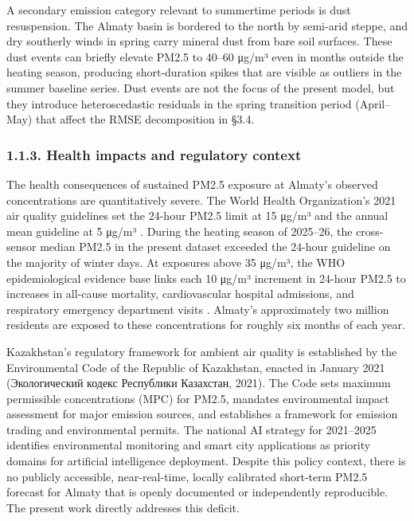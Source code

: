 A secondary emission category relevant to summertime periods is dust resuspension. The Almaty basin is bordered to the north by semi-arid steppe, and dry southerly winds in spring carry mineral dust from bare soil surfaces. These dust events can briefly elevate PM2.5 to 40--60 μg/m³ even in months outside the heating season, producing short-duration spikes that are visible as outliers in the summer baseline series. Dust events are not the focus of the present model, but they introduce heteroscedastic residuals in the spring transition period (April--May) that affect the RMSE decomposition in §3.4.

\subsubsection{1.1.3. Health impacts and regulatory context}\label{health-impacts-and-regulatory-context}

The health consequences of sustained PM2.5 exposure at Almaty's observed concentrations are quantitatively severe. The World Health Organization's 2021 air quality guidelines set the 24-hour PM2.5 limit at 15 μg/m³ and the annual mean guideline at 5 μg/m³ \cite{who_aqg_2021}. During the heating season of 2025--26, the cross-sensor median PM2.5 in the present dataset exceeded the 24-hour guideline on the majority of winter days. At exposures above 35 μg/m³, the WHO epidemiological evidence base links each 10 μg/m³ increment in 24-hour PM2.5 to increases in all-cause mortality, cardiovascular hospital admissions, and respiratory emergency department visits \cite{WHO2013revihaap}. Almaty's approximately two million residents are exposed to these concentrations for roughly six months of each year.

Kazakhstan's regulatory framework for ambient air quality is established by the Environmental Code of the Republic of Kazakhstan, enacted in January 2021 (Экологический кодекс Республики Казахстан, 2021). The Code sets maximum permissible concentrations (MPC) for PM2.5, mandates environmental impact assessment for major emission sources, and establishes a framework for emission trading and environmental permits. The national AI strategy for 2021--2025 identifies environmental monitoring and smart city applications as priority domains for artificial intelligence deployment. Despite this policy context, there is no publicly accessible, near-real-time, locally calibrated short-term PM2.5 forecast for Almaty that is openly documented or independently reproducible. The present work directly addresses this deficit.

